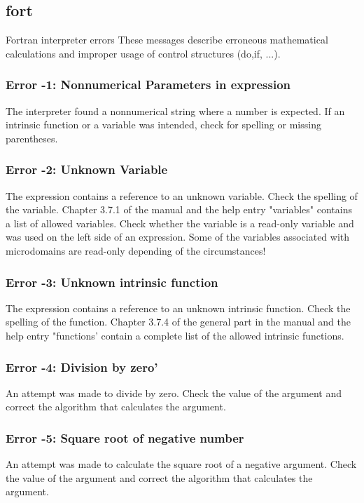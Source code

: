 \subsection*{fort}
\par
Fortran interpreter errors 
These messages describe erroneous mathematical calculations and 
improper usage of control structures (do,if, ...). 
\par
\subsubsection{Error -1: Nonnumerical Parameters in expression}
\par
The interpreter found a nonnumerical string where a number is expected. 
If an intrinsic function or a variable was intended, check for spelling 
or missing parentheses. 
\subsubsection{Error -2: Unknown Variable}
\par
The expression contains a reference to an unknown variable. Check the 
spelling of the variable. Chapter 3.7.1 of the manual and the help 
entry "variables" contains a list of allowed variables. 
Check whether the variable is a read-only variable and was used on the 
left side of an expression. Some of the variables associated with 
microdomains are read-only depending of the circumstances! 
\subsubsection{Error -3: Unknown intrinsic function}
\par
The expression contains a reference to an unknown intrinsic function. 
Check the spelling of the function. Chapter 3.7.4 of the general part 
in the manual and the help entry "functions' contain a complete list 
of the allowed intrinsic functions. 
\subsubsection{Error -4: Division by zero'}
\par
An attempt was made to divide by zero. Check the value of the argument 
and correct the algorithm that calculates the argument. 
\subsubsection{Error -5: Square root of negative number}
\par
An attempt was made to calculate the square root of a negative argument. 
Check the value of the argument and correct the algorithm that calculates 
the argument. 
